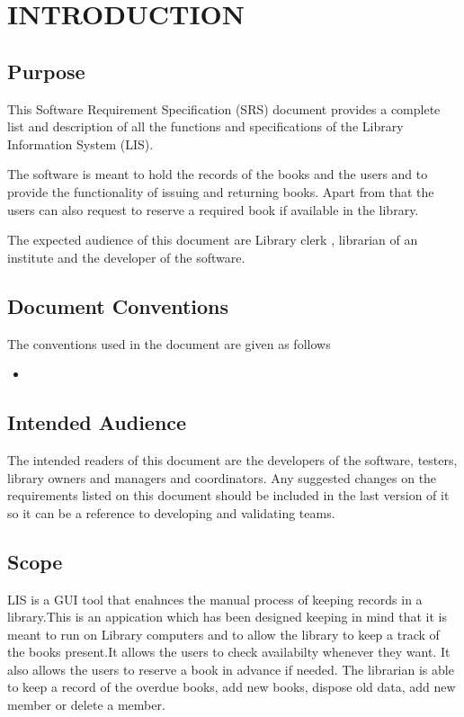 \documentclass{article}
\begin{document}

\section{INTRODUCTION}

\subsection{Purpose}
This Software Requirement Specification (SRS) document provides a complete list and description of all the functions and specifications of the Library Information System (LIS).

The software is meant to hold the records of the books and the users and to provide the functionality of issuing and returning books. Apart from that the users can also request to reserve a required book if available in the library.

The expected audience of this document are Library clerk , librarian of an institute and the developer of the software.

\subsection{Document Conventions}
The conventions used in the document are given as follows
\begin{itemize}
\item 
\end{itemize}
\subsection{Intended Audience}
The intended readers of this document are the developers of the software, testers, library owners
and managers and coordinators.
Any suggested changes on the requirements listed on this document should be included in
the last version of it so it can be a reference to developing and validating teams.
\subsection{Scope}
LIS is a GUI tool that enahnces the manual process of keeping records in a library.This is an appication which has been designed keeping in mind that it is meant to run on Library computers and to allow the library to keep a track of the books present.It allows the users to check availabilty whenever they want. It also allows the users to reserve a book in advance if needed. The librarian is able to keep a record of the overdue books, add new books, dispose old data, add new member or delete a member. 
\end{document}
